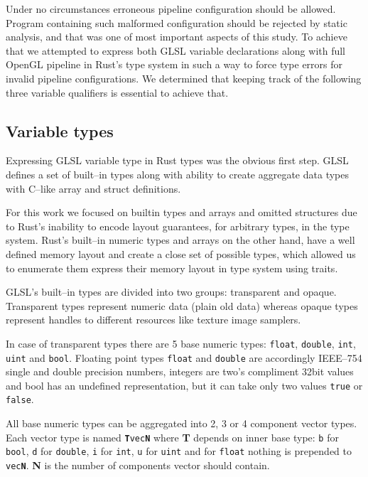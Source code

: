 Under no circumstances erroneous pipeline configuration should be allowed. Program containing such malformed configuration should be rejected by static analysis, and that was one of most important aspects of this study.
To achieve that we attempted to express both GLSL variable declarations along with full OpenGL pipeline in Rust's type system in such a way to force type errors for invalid pipeline configurations.
We determined that keeping track of the following three variable qualifiers is essential to achieve that.

\subsection{Variable types}

Expressing GLSL variable type in Rust types was the obvious first step. GLSL defines a set of built--in types along with ability to create aggregate data types with C--like array and struct definitions.

For this work we focused on builtin types and arrays and omitted structures due to Rust's inability to encode layout guarantees, for arbitrary types, in the type system.
Rust's built--in numeric types and arrays on the other hand, have a well defined memory layout and create a close set of possible types, 
which allowed us to enumerate them express their memory layout in type system using traits.

GLSL's built--in types are divided into two groups: transparent and opaque.
Transparent types represent numeric data (plain old data) whereas opaque types represent handles to different resources like texture image samplers.

In case of transparent types there are 5 base numeric types: \texttt{float}, \texttt{double}, \texttt{int}, \texttt{uint} and \texttt{bool}.
Floating point types \texttt{float} and \texttt{double} are accordingly IEEE--754 single and double precision numbers, integers are two's compliment 32bit values and bool has an undefined representation, but it can take only two values \texttt{true} or \texttt{false}.

All base numeric types can be aggregated into 2, 3 or 4 component vector types. Each vector type is named \texttt{\textbf{T}vec\textbf{N}}
where \textbf{T} depends on inner base type: \texttt{b} for \texttt{bool}, \texttt{d} for \texttt{double}, \texttt{i} for \texttt{int}, \texttt{u} for \texttt{uint} and for \texttt{float} nothing is prepended to \texttt{vec\textbf{N}}.
\textbf{N} is the number of components vector should contain.

